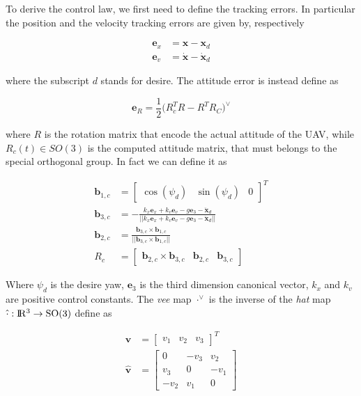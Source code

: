 \noindent To derive the control law, we first need to define the tracking errors. In particular the position and the velocity tracking errors are given by, respectively

\begin{align}
	\mathbf{e}_x &= \mathbf{x} - \mathbf{x}_d \\ 
	\mathbf{e}_v &= \dot{\mathbf{x}} - \dot{\mathbf{x}}_d
\end{align}

\noindent where the subscript $d$ stands for desire. The attitude error is instead define as

\begin{equation}
	\mathbf{e}_R = \frac{1}{2}\bigl(R_c^TR-R^TR_C \bigl)^{\vee}
\end{equation}

\noindent where $R$ is the rotation matrix that encode the actual attitude of the UAV, while $R_c(t) \in SO(3)$ is the computed attitude matrix, that must belongs to the special orthogonal group. In fact we can define it as

\begin{align}
	\mathbf{b}_{1,c} &= \begin{bmatrix} \cos(\psi_d) & \sin(\psi_d) & 0 \end{bmatrix}^T \\
	\mathbf{b}_{3,c} &= -\frac{k_x\mathbf{e}_x+k_v\mathbf{e}_v-g\mathbf{e}_3-\ddot{\mathbf{x}}_d}{||k_x\mathbf{e}_x+k_v\mathbf{e}_v-g\mathbf{e}_3-\ddot{\mathbf{x}}_d||} \\
	\mathbf{b}_{2,c} &= \frac{\mathbf{b}_{3,c}\times\mathbf{b}_{1,c}}{||\mathbf{b}_{3,c}\times\mathbf{b}_{1,c}||} \\
	R_c &= \left[\begin{array}{c|c|c}\mathbf{b}_{2,c}\times\mathbf{b}_{3,c} & \mathbf{b}_{2,c} & \mathbf{b}_{3,c} \end{array}\right]
\end{align}

\noindent Where $\psi_d$ is the desire yaw, $\mathbf{e}_3$ is the third dimension canonical vector, $k_x$ and $k_v$ are positive control constants. The \textit{vee} map $\cdot^{\vee}$ is the inverse of the \textit{hat} map $\hat{\cdot}: \rm I\!R^3 \rightarrow SO(3)$ define as

\begin{align}
	\mathbf{v} &= \begin{bmatrix} v_1 & v_2 & v_3 \end{bmatrix}^T \nonumber \\ 
	\hat{\mathbf{v}} &= 
	\begin{bmatrix}
		0    & -v_3 & v_2 \\
		v_3  & 0    & -v_1 \\
		-v_2 & v_1  & 0
	\end{bmatrix}
\end{align}

